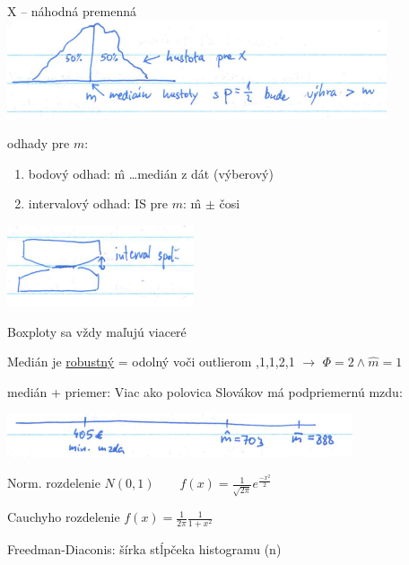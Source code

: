 \documentclass[unknownkeysallowed]{article}
\begin{document}
X -- náhodná premenná \includegraphics[width=0.5\linewidth]{imgs/obr3.png}

\vspace{5mm}

\begin{multicols}{2}
odhady pre $m$:
\begin{enumerate}
\item bodový odhad: \^{m} \ldots medián z dát (výberový)
\item intervalový odhad: IS pre $m$: \^{m} $\pm$ čosi
\end{enumerate}
\columnbreak
\includegraphics[width=0.5\linewidth]{imgs/obr4.png}
\end{multicols}

\vspace{5mm}
Boxploty sa vždy maľujú viaceré

Medián je \underline{robustný} = odolný voči outlierom ,1,1,2,1 $\to$ $\Phi = 2 \land \hat{m} = 1$

\vspace{5mm}

medián + priemer: Viac ako polovica Slovákov má podpriemernú mzdu:
\begin{center}
\includegraphics[width=0.5\linewidth]{imgs/obr5.png}
\end{center}

Norm. rozdelenie $N(0,1) \qquad f(x) = \frac{1}{\sqrt{2\pi}}e^{\frac{-x^2}{2}}$

Cauchyho rozdelenie $f(x) = \frac{1}{2\pi}\frac{1}{1+x^2}$

\vspace{5mm}
Freedman-Diaconis: šírka stĺpčeka histogramu (n)
\end{document}
